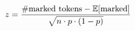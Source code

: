 \documentclass[preview]{standalone}
\begin{document}
\begin{align*}
\special{dvisvgm:raw <g id='unique000'>}z = \frac{\#\text{marked tokens} - \mathbb{E}[\text{marked}]}{\sqrt{n \cdot p \cdot (1-p)}}\special{dvisvgm:raw </g>}
\end{align*}
\end{document}
